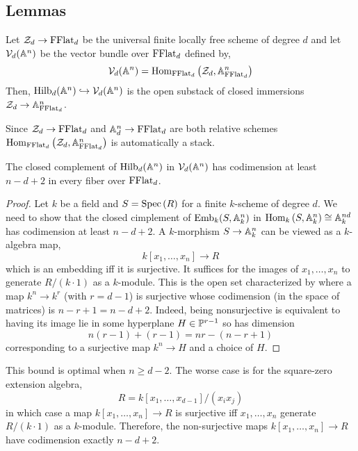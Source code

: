 \documentclass[12pt]{article}
\begin{document}
\subsection{Lemmas}

\newcommand{\cZ}{\mathcal{Z}}
\newcommand{\Rees}{\mathrm{Rees}}

\begin{defn}
Let $\cZ_d \to \FFlat_d$ be the universal finite locally free scheme of degree $d$ and let $\cV_d(\A^n)$ be the vector bundle over $\FFlat_d$ defined by,
\[ \cV_d(\A^n) = \Hom{\FFlat_d}{\cZ_d}{\A^n_{\FFlat_d}} \]
Then, $\Hilb_d(\A^n) \embed \cV_d(\A^n)$ is the open substack of closed immersions $\cZ_d \to \A^n_{\FFlat_d}$. 
\end{defn}

\begin{rmk}
Since $\cZ_d \to \FFlat_d$ and $\A_d^n \to \FFlat_d$ are both relative schemes $\Hom{\FFlat_d}{\cZ_d}{\A^n_{\FFlat_d}}$ is automatically a stack. 
\end{rmk}

\begin{lemma}
The closed complement of $\Hilb_d(\A^n)$ in $\cV_d(\A^n)$ has codimension at least $n-d+2$ in every fiber over $\FFlat_d$. 
\end{lemma}

\begin{proof}
Let $k$ be a field and $S = \Spec{R}$ for a finite $k$-scheme of degree $d$. We need to show that the closed cimplement of $\mathrm{Emb}_k(S, \A^n_k)$ in $\Hom{k}{S}{\A^n_k} \cong \A^{nd}_k$ has codimension at least $n - d + 2$. A $k$-morphism $S \to \A^n_k$ can be viewed as a $k$-algebra map,
\[ k[x_1, \dots, x_n] \to R \]
which is an embedding iff it is surjective. It suffices for the images of $x_1, \dots, x_n$ to generate $R / (k \cdot 1)$ as a $k$-module. This is the open set characterized by where a map $k^n \to k^{r}$ (with $r = d-1$) is surjective whose codimension (in the space of matrices) is $n - r + 1 = n - d + 2$. Indeed, being nonsurjective is equivalent to having its image lie in some hyperplane $H \in \P^{r-1}$ so has dimension \[ n(r-1) + (r-1) = nr - (n - r + 1) \] corresponding to a surjective map $k^n \to H$ and a choice of $H$.
\end{proof}

\begin{rmk}
This bound is optimal when $n \ge d - 2$. The worse case is for the square-zero extension algebra,
\[ R = k[x_1, \dots, x_{d-1}]/(x_i x_j) \]
in which case a map $k[x_1, \dots, x_n] \to R$ is surjective iff $x_1, \dots, x_n$ generate $R / (k \cdot 1)$ as a $k$-module. Therefore, the non-surjective maps $k[x_1, \dots, x_n] \to R$ have codimension exactly $n - d + 2$. 
\end{rmk}
\end{document}
